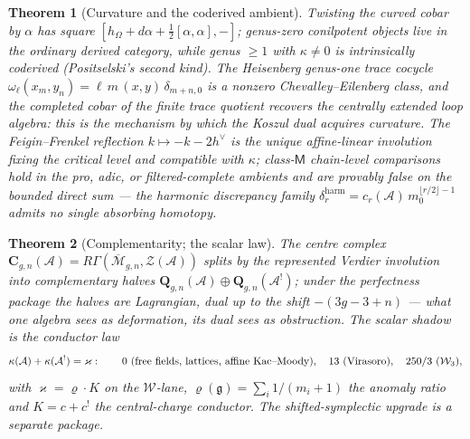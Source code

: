 \documentclass[11pt]{article}
\providecommand{\cA}{\mathcal{A}}
\providecommand{\cW}{\mathcal{W}}
\providecommand{\cZ}{\mathcal{Z}}
\providecommand{\fg}{\mathfrak{g}}
\providecommand{\Mbar}{\overline{\mathcal{M}}}
\newtheorem{theorem}{Theorem}[section]
\begin{document}
\begin{theorem}[Curvature and the coderived ambient]\label{thm:curv}
Twisting the curved cobar by $\alpha$ has square
$[h_\Omega+d\alpha+\tfrac12[\alpha,\alpha],-]$; genus-zero
conilpotent objects live in the ordinary derived category, while
genus $\ge1$ with $\kappa\neq0$ is intrinsically coderived
\textup{(Positselski's second kind)}. The Heisenberg genus-one trace
cocycle $\omega_\ell(x_m,y_n)=\ell\,m\,(x,y)\,\delta_{m+n,0}$ is a
nonzero Chevalley--Eilenberg class, and the completed cobar of the
finite trace quotient recovers the centrally extended loop algebra:
this is the mechanism by which the Koszul dual acquires curvature.
The Feigin--Frenkel reflection $k\mapsto-k-2h^\vee$ is the unique
affine-linear involution fixing the critical level and compatible
with $\kappa$; class-$\mathsf M$ chain-level comparisons hold in the
pro, adic, or filtered-complete ambients and are provably false on
the bounded direct sum --- the harmonic discrepancy family
$\delta_r^{\mathrm{harm}}=c_r(\cA)\,m_0^{\lfloor r/2\rfloor-1}$
admits no single absorbing homotopy.
\end{theorem}

\begin{theorem}[Complementarity; the scalar law]\label{thm:C}
The centre complex $\mathbf C_{g,n}(\cA)=
R\Gamma(\Mbar_{g,n},\cZ(\cA))$ splits by the represented Verdier
involution into complementary halves
$\mathbf Q_{g,n}(\cA)\oplus\mathbf Q_{g,n}(\cA^!)$; under the
perfectness package the halves are Lagrangian, dual up to the shift
$-(3g-3+n)$ --- what one algebra sees as deformation, its dual sees
as obstruction. The scalar shadow is the conductor law
\[
\kappa(\cA)+\kappa(\cA^!)=\varkappa:
\qquad
0\ \textup{(free fields, lattices, affine Kac--Moody)},\quad
13\ \textup{(Virasoro)},\quad
250/3\ (\cW_3),
\]
with $\varkappa=\varrho\cdot K$ on the $\cW$-lane, $\varrho(\fg)=\sum_i
1/(m_i+1)$ the anomaly ratio and $K=c+c^!$ the central-charge
conductor. The shifted-symplectic upgrade is a separate package.
\end{theorem}
\end{document}
